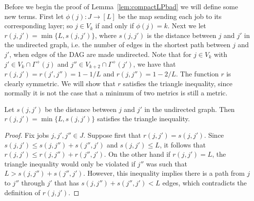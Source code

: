 Before we begin the proof of Lemma~\ref{lem:compactLPbad} we will define some new terms. First let $\phi(j) : J \rightarrow [L]$ be the map sending each job to its corresponding layer; so $j \in V_{k}$ if and only if $\phi(j) = k$.
Next we let $r(j,j')=\min\{L,s(j,j')\}$, where $s(j,j')$ is the distance between $j$ and $j'$ in the undirected graph, i.e. the number of edges in the shortest path between $j$ and $j'$, when edges of the DAG are made undirected.
Note that for $j \in V_k$ with $j' \in V_{k}\cap \Gamma^+(j)$ and $j'' \in V_{k+2} \cap \Gamma^+(j')$, we have that $r(j,j')=r(j',j'')=1-1/L$ and $r(j,j'') = 1-2/L$. The function $r$ is clearly symmetric. We will show that $r$ satisfies the triangle inequality, since normally it is not the case that a minimum of two metrics is still a metric.

\begin{lemma}\label{lem:triangle_s}
Let $s(j,j')$ be the distance between $j$ and $j'$ in the undirected graph. Then
 $r(j,j') = \min\{L,s(j,j')\}$ satisfies the triangle inequality.
\end{lemma}
\begin{proof}
Fix jobs $j,j',j'' \in J$. Suppose first that $r(j,j') = s(j,j')$. Since $s(j,j') \leq s(j,j'')+s(j'',j')$ and $s(j,j') \leq L$, it follows that $r(j,j') \leq r(j,j'')+r(j'',j')$. 
On the other hand if $r(j,j') =L$, the triangle inequality would only be violated if $j''$ was such that $L > s(j,j'') + s(j'',j')$. However, this inequality implies there is a path from $j$ to $j''$ through $j'$ that has $s(j,j'') + s(j'',j') <L$ edges, which contradicts the definition of $r(j,j')$.
\end{proof}





